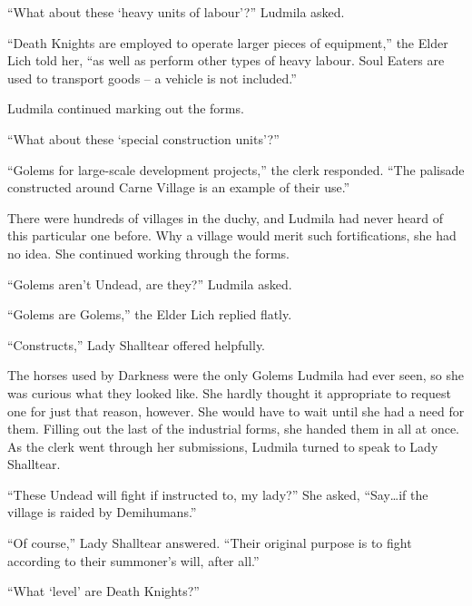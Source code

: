  

“What about these ‘heavy units of labour’?” Ludmila asked.

 

“Death Knights are employed to operate larger pieces of equipment,” the Elder Lich told her, “as well as perform other types of heavy labour. Soul Eaters are used to transport goods – a vehicle is not included.”

 

Ludmila continued marking out the forms.

 

“What about these ‘special construction units’?”

 

“Golems for large-scale development projects,” the clerk responded. “The palisade constructed around Carne Village is an example of their use.”

 

There were hundreds of villages in the duchy, and Ludmila had never heard of this particular one before. Why a village would merit such fortifications, she had no idea. She continued working through the forms.

 

“Golems aren’t Undead, are they?” Ludmila asked.

 

“Golems are Golems,” the Elder Lich replied flatly.

 

“Constructs,” Lady Shalltear offered helpfully.

 

The horses used by Darkness were the only Golems Ludmila had ever seen, so she was curious what they looked like. She hardly thought it appropriate to request one for just that reason, however. She would have to wait until she had a need for them. Filling out the last of the industrial forms, she handed them in all at once. As the clerk went through her submissions, Ludmila turned to speak to Lady Shalltear.

 

“These Undead will fight if instructed to, my lady?” She asked, “Say…if the village is raided by Demihumans.”

 

“Of course,” Lady Shalltear answered. “Their original purpose is to fight according to their summoner’s will, after all.”

 

“What ‘level’ are Death Knights?”

